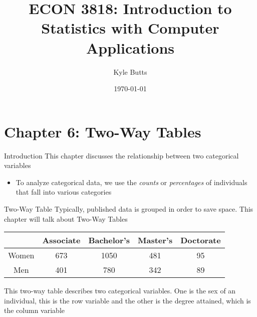 \documentclass{beamer}
\title{ECON 3818: Introduction to Statistics with Computer Applications}
\date{\today}
\author{Kyle Butts}
\begin{document}
\maketitle




\section{Chapter 6: Two-Way Tables}
\begin{frame}{Introduction}
	This chapter discusses the relationship between two categorical variables
	\begin{itemize}
		\item To analyze categorical data, we use the \textit{counts} or \textit{percentages} of individuals that fall into various categories
	\end{itemize}
\end{frame}

\begin{frame}{Two-Way Table}
	Typically, published data is grouped in order to save space. This chapter will talk about \alert{Two-Way Tables}
	
	
	\begin{center}
		\footnotesize{
			\begin{tabular}{|c|c|c|c|c|}
				\hline
				\diagbox{Sex}{Degree} & Associate & Bachelor's & Master's & Doctorate \\
				\hline
				Women                           & 673       & 1050       & 481      & 95        \\
				\hline
				Men                             & 401       & 780        & 342      & 89        \\
				\hline
			\end{tabular}}
	\end{center}
	This two-way table describes two categorical variables. One is the sex of an individual, this is the \alert{row variable} and the other is the degree attained, which is the \alert{column variable}
\end{frame}
\end{document}
